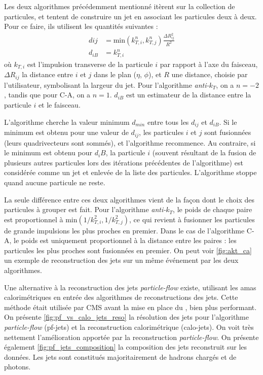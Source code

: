 Les deux algorithmes précédemment mentionné itèrent sur la collection de particules, et tentent de construire un jet en associant les particules deux à deux. Pour ce faire, ils utilisent les quantités suivantes :
\begin{align*}
  d{ij} &= \text{min}\left( k_{T, i}^n, k_{T, j}^n \right) \frac{\Delta R^2_{ij}}{R^2} \\
  d_{iB} &= k^n_{T, i}
\end{align*}
où $k_{T, i}$ est l'impulsion transverse de la particule $i$ par rapport à l'axe du faisceau, $\Delta R_{ij}$ la distance entre $i$ et $j$ dans le plan ($\eta$, $\phi$), et $R$ une distance, choisie par l'utilisateur, symbolisant la largeur du jet. Pour l'algorithme \emph{anti-$k_T$}, on a $n = -2$, tandis que pour C-A, on a $n = 1$. $d_{iB}$ est un estimateur de la distance entre la particule $i$ et le faisceau.

L'algorithme cherche la valeur minimum $d_{min}$ entre tous les $d_{ij}$ et $d_{iB}$. Si le minimum est obtenu pour une valeur de $d_{ij}$, les particules $i$ et $j$ sont fusionnées (leurs quadrivecteurs sont sommés), et l'algorithme recommence. Au contraire, si le minimum est obtenu pour $d_iB$, la particule $i$ (souvent résultant de la fusion de plusieurs autres particules lors des itérations précédentes de l'algorithme) est considérée comme un jet et enlevée de la liste des particules. L'algorithme stoppe quand aucune particule ne reste.

La seule différence entre ces deux algorithmes vient de la façon dont le choix des particules à grouper est fait. Pour l'algorithme \emph{anti-$k_T$}, le poids de chaque paire est proportionnel à $\text{min}\left( 1 / k^2_{T,i}, 1 / k^2_{T,j} \right)$, ce qui revient à fusionner les particules de grande impulsions les plus proches en premier. Dans le cas de l'algorithme C-A, le poids est uniquement proportionnel à la distance entre les paires : les particules les plus proches sont fusionnées en premier. On peut voir \cref{fig:akt_ca} un exemple de reconstruction des jets sur un même événement par les deux algorithmes.

\bigskip

Une alternative à la reconstruction des jets \emph{particle-flow} existe, utilisant les amas calorimétriques en entrée des algorithmes de reconstructions des jets. Cette méthode était utilisée par CMS avant la mise en place du \pf, bien plus performant. On présente \cref{fig:pf_vs_calo_jets_reso} la résolution des jets pour l'algorithme \emph{particle-flow} (pf-jets) et la reconstruction calorimétrique (calo-jets). On voit très nettement l'amélioration apportée par la reconstruction \emph{particle-flow}. On présente également \cref{fig:pf_jets_composition} la composition des jets \pf reconstruit sur les données. Les jets sont constitués majoritairement de hadrons chargés et de photons.

